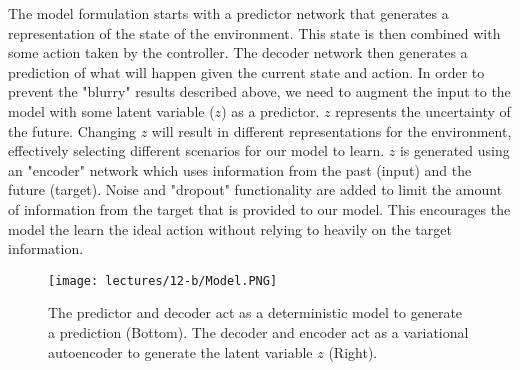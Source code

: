 The model formulation starts with a predictor network that generates a representation of the state of the environment. This state is then combined with some action taken by the controller. The decoder network then generates a prediction of what will happen given the current state and action. In order to prevent the "blurry" results described above, we need to augment the input to the model with some latent variable ($z$) as a predictor. $z$ represents the uncertainty of the future. Changing $z$ will result in different representations for the environment, effectively selecting different scenarios for our model to learn. $z$ is generated using an "encoder" network which uses information from the past (input) and the future (target). Noise and "dropout" functionality are added to limit the amount of information from the target that is provided to our model. This encourages the model the learn the ideal action without relying to heavily on the target information.

\begin{figure}[h!]
\centering
\texttt{[image: lectures/12-b/Model.PNG]}
\caption{The predictor and decoder act as a deterministic model to generate a prediction (Bottom). The decoder and encoder act as a variational autoencoder to generate the latent variable $z$ (Right).
}
\label{fig:model}
\end{figure}